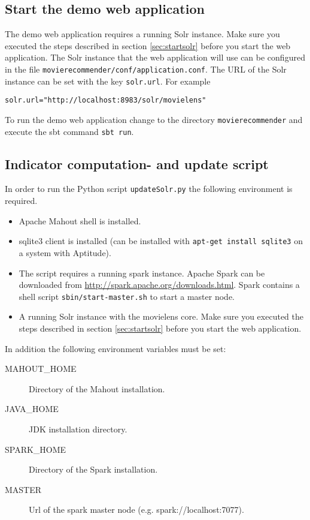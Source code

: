 \subsection{Start the demo web application}

The demo web application requires a running Solr instance. Make sure you executed the steps described in section \ref{sec:startsolr} before you start the web application. The Solr instance that the web application will use can be configured in the file \verb|movierecommender/conf/application.conf|. The URL of the Solr instance can be set with the key \verb|solr.url|. For example
\begin{verbatim}
solr.url="http://localhost:8983/solr/movielens"
\end{verbatim}

To run the demo web application change to the directory \verb|movierecommender| and execute the sbt command \verb|sbt run|.

\subsection{Indicator computation- and update script}
In order to run the Python script \verb|updateSolr.py| the following environment is required.
\begin{itemize}
\item Apache Mahout shell is installed.
\item sqlite3 client is installed (can be installed with \verb|apt-get install sqlite3| on a system with Aptitude). 
\item The script requires a running spark instance. Apache Spark can be downloaded from \url{http://spark.apache.org/downloads.html}. Spark contains a shell script \verb|sbin/start-master.sh| to start a master node.
\item A running Solr instance with the movielens core. Make sure you executed the steps described in section \ref{sec:startsolr} before you start the web application.
\end{itemize}

In addition the following environment variables must be set:
\begin{description}
\item[MAHOUT\_HOME] Directory of the Mahout installation.
\item[JAVA\_HOME] JDK installation directory.
\item[SPARK\_HOME] Directory of the Spark installation.
\item[MASTER] Url of the spark master node (e.g. spark://localhost:7077).
\end{description}

